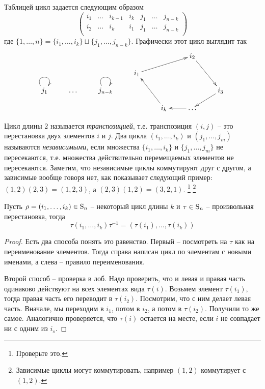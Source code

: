 Таблицей цикл задается следующим образом
\[
\begin{pmatrix}
{i_1}&{\ldots}&{i_{k-1}}&{i_k}&{j_1}&{\ldots}&{j_{n-k}}\\
{i_2}&{\ldots}&{i_k}&{i_1}&{j_{1}}&{\ldots}&{j_{n-k}}\\
\end{pmatrix}
\]
где $\{1,\ldots,n\} = \{i_1,\ldots,i_k\}\sqcup\{j_1,\ldots,j_{n-k}\}$.
Графически этот цикл выглядит так
\[
\xymatrix@R=10pt{
	{}&{}&{}&{}&{}&{i_2}\ar[rdd]&{}\\
	{}&{}&{}&{i_1}\ar[urr]&{}&{}&{}\\
	{j_1}\ar@(ul,ur)&{\ldots}&{j_{n-k}}\ar@(ul,ur)&{}&{}&{}&{i_3}\ar[dl]\\
	{}&{}&{}&{}&{i_k}\ar[uul]&{\ldots}\ar[l]&{}\\
}
\]

Цикл длины $2$ называется {\it транспозицией}, т.е. транспозиция $(i,j)$ -- это перестановка двух элементов $i$ и $j$.
Два цикла $(i_1,\ldots,i_k)$ и $(j_1,\ldots,j_m)$ называются {\it независимыми}, если множества $\{i_1,\ldots,i_k\}$ и $\{j_1,\ldots,j_m\}$ не пересекаются, т.е. множества действительно перемещаемых элементов не пересекаются.
Заметим, что независимые циклы коммутируют друг с другом, а зависимые вообще говоря нет, как показывает следующий пример: $(1,2)(2,3) = (1,2,3)$, а $(2,3)(1,2) = (3,2,1)$.%
\footnote{Проверьте это.}
\footnote{Зависимые циклы могут коммутировать, например $(1,2)$ коммутирует с $(1,2)$.}

\begin{claim}
\label{claim:CycleRename}
Пусть $\rho = (i_1,\ldots, i_k)\in\operatorname{S}_{n}$ -- некоторый цикл длины $k$ и $\tau\in\operatorname{S}_{n}$ -- произвольная перестановка, тогда 
\[
\tau(i_1,\ldots,i_k)\tau^{-1} = (\tau(i_1),\ldots,\tau(i_k))
\]
\end{claim}
\begin{proof}
Есть два способа понять это равенство.
Первый -- посмотреть на $\tau$ как на переименование элементов.
Тогда справа написан цикл по элементам с новыми именами, а слева -- правило переименования.

Второй способ -- проверка в лоб.
Надо проверить, что и левая и правая часть одинаково действуют на всех элементах вида $\tau(i)$.
Возьмем элемент $\tau(i_1)$, тогда правая часть его переводит в $\tau(i_2)$.
Посмотрим, что с ним делает левая часть.
Вначале, мы переходим в $i_1$, потом в $i_2$, а потом в $\tau(i_2)$.
Получили то же самое.
Аналогично проверяется, что $\tau(i)$ остается на месте, если $i$ не совпадает ни с одним из $i_s$.
\end{proof}


